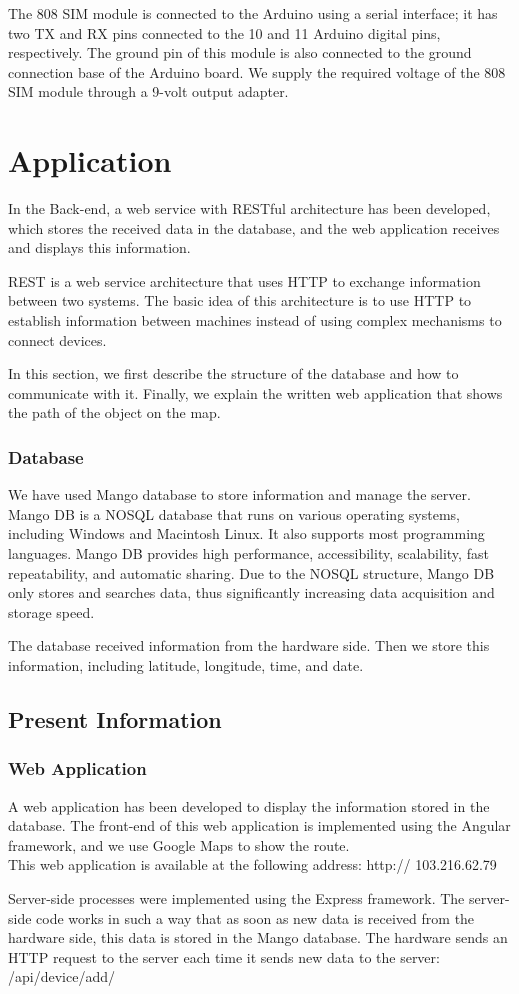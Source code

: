 The 808 SIM module is connected to the Arduino using a serial interface; it has two TX and RX pins connected to the 10 and 11 Arduino digital pins, respectively. The ground pin of this module is also connected to the ground connection base of the Arduino board. We supply the required voltage of the 808 SIM module through a 9-volt output adapter.
\section{Application}
In the Back-end, a web service with RESTful architecture has been developed, which stores the received data in the database, and the web application receives and displays this information.

REST is a web service architecture that uses HTTP to exchange information between two systems. The basic idea of this architecture is to use HTTP to establish information between machines instead of using complex mechanisms to connect devices.

In this section, we first describe the structure of the database and how to communicate with it. Finally, we explain the written web application that shows the path of the object on the map.
\subsubsection{Database}
We have used Mango database to store information and manage the server. Mango DB is a NOSQL database that runs on various operating systems, including Windows and Macintosh Linux. It also supports most programming languages. Mango DB provides high performance, accessibility, scalability, fast repeatability, and automatic sharing.
Due to the NOSQL structure, Mango DB only stores and searches data, thus significantly increasing data acquisition and storage speed.

The database received information from the hardware side. Then we store this information, including latitude, longitude, time, and date.

\subsection{Present Information}
\subsubsection{Web Application}
A web application has been developed to display the information stored in the database. The front-end of this web application is implemented using the Angular framework, and we use Google Maps to show the route.\\
This web application is available at the following address: http:// 103.216.62.79

Server-side processes were implemented using the Express framework. The server-side code works in such a way that as soon as new data is received from the hardware side, this data is stored in the Mango database. The hardware sends an HTTP request to the server each time it sends new data to the server: /api/device/add/

